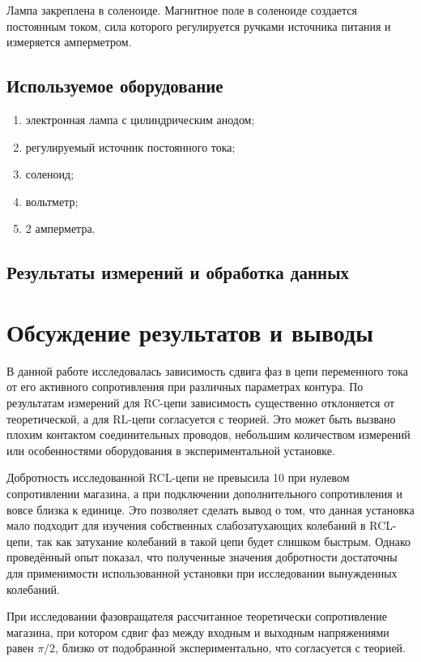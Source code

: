 \documentclass[a4paper, 12pt]{article}
\begin{document}
Лампа закреплена в соленоиде. Магнитное поле в соленоиде создается постоянным током, сила которого регулируется ручками источника питания и измеряется амперметром.

\subsection{Используемое оборудование}

\begin{enumerate}
    \item электронная лампа с цилиндрическим анодом;
    \item регулируемый источник постоянного тока;
    \item соленоид;
    \item вольтметр;
    \item 2 амперметра.
\end{enumerate}

\subsection{Результаты измерений и обработка данных}



\section{Обсуждение результатов и выводы}

В данной работе исследовалась зависимость сдвига фаз в цепи переменного тока от его активного сопротивления при различных параметрах контура. По результатам измерений для RC-цепи зависимость существенно отклоняется от теоретической, а для RL-цепи согласуется с теорией. Это может быть вызвано плохим контактом соединительных проводов, небольшим количеством измерений или особенностями оборудования в экспериментальной установке.

Добротность исследованной RCL-цепи не превысила 10 при нулевом сопротивлении магазина, а при подключении дополнительного сопротивления и вовсе близка к единице. Это позволяет сделать вывод о том, что данная установка мало подходит для изучения собственных слабозатухающих колебаний в RCL-цепи, так как затухание колебаний в такой цепи будет слишком быстрым. Однако проведённый опыт показал, что полученные значения добротности достаточны для применимости использованной установки при исследовании вынужденных колебаний.

При исследовании фазовращателя рассчитанное теоретически сопротивление магазина, при котором сдвиг фаз между входным и выходным напряжениями равен $\pi/2$, близко от подобранной экспериментально, что согласуется с теорией.
\end{document}
